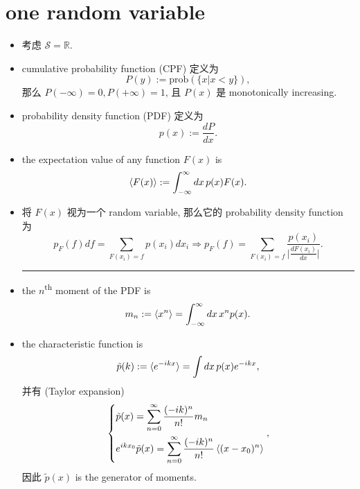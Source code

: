 \section{one random variable}
\begin{itemize}
	\item 考虑 $\mathcal{S} = \mathbb{R}$.
	
	\item cumulative probability function (CPF) 定义为
	\begin{equation}
		P(y) := \mathrm{prob}(\{x | x < y\}),
	\end{equation}
	那么 $P(- \infty) = 0, P(+ \infty) = 1$, 且 $P(x)$ 是 monotonically increasing.
	
	\item probability density function (PDF) 定义为
	\begin{equation}
		p(x) := \frac{dP}{dx}.
	\end{equation}
	
	\item the expectation value of any function $F(x)$ is
	\begin{equation}
		\braket{F(x)} := \int_{- \infty}^\infty dx \, p(x) F(x).
	\end{equation}
	
	\item 将 $F(x)$ 视为一个 random variable, 那么它的 probability density function 为
	\begin{equation}
		p_F(f) df = \sum_{F(x_i) = f} p(x_i) dx_i \Longrightarrow p_F(f) = \sum_{F(x_i) = f} \frac{p(x_i)}{\big| \frac{dF(x_i)}{dx} \big|}.
	\end{equation}
	
	\noindent\rule[0.5ex]{\linewidth}{0.5pt} %
	
	\item the $n$\textsuperscript{th} moment of the PDF is
	\begin{equation}
		m_n := \braket{x^n} = \int_{- \infty}^\infty dx \, x^n p(x).
	\end{equation}
	
	\item the characteristic function is
	\begin{equation}
		\tilde{p}(k) := \braket{e^{- i k x}} = \int dx \, p(x) e^{- i k x},
	\end{equation}
	并有 (Taylor expansion)
	\begin{equation}
		\begin{dcases}
			\tilde{p}(x) = \sum_{n = 0}^\infty \frac{(- i k)^n}{n!} m_n \\
			e^{i k x_0} \tilde{p}(x) = \sum_{n = 0}^\infty \frac{(- i k)^n}{n!} \braket{(x - x_0)^n}
		\end{dcases},
	\end{equation}
	因此 $\tilde{p}(x)$ is the generator of moments.
	

\end{itemize}
